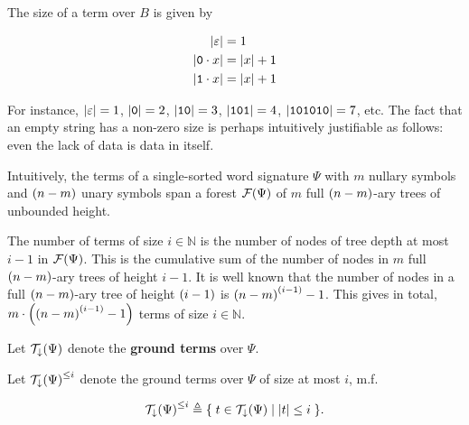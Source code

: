 \begin{example} The size of a term over $B$ is given by

\begin{align*}
\card{\varepsilon} &= 1 \\
\card{\mathtt{0} \cdot x} &= \card{x} + 1 \\
\card{\mathtt{1} \cdot x} &= \card{x} + 1
\end{align*}

For instance, $\card{\varepsilon}=1$, $\card{\symb{0}} = 2$,
$\card{\symb{1}\symb{0}} = 3$, $\card{\symb{1}\symb{0}\symb{1}} = 4$,
$\card{\symb{1}\symb{0}\symb{1}\symb{0}\symb{1}\symb{0}} = 7$, etc. The fact
that an empty string has a non-zero size is perhaps intuitively justifiable as
follows: even the lack of data is data in itself.

Intuitively, the terms of a single-sorted word signature $\Psi$ with $m$
nullary symbols and $\p{n-m}$ unary symbols span a forest $\mathcal{F}\p{\Psi}$
of $m$ full $\p{n-m}$-ary trees of unbounded height.


The number of terms of size $i\in\mathbb{N}$ is the number of nodes of tree
depth at most $i-1$ in $\mathcal{F}\p{\Psi}$. This is the cumulative sum of the
number of nodes in $m$ full $\p{n-m}$-ary trees of height $i-1$. It is well
known that the number of nodes in a full $\p{n-m}$-ary tree of height $\p{i-1}$
is $\p{n-m}^\p{i-1}-1$. This gives in total, $m \cdot \p{\p{n-m}^\p{i-1}-1}$
terms of size $i\in\mathbb{N}$.

\end{example}

\begin{definition} Let $\mathcal{T}_\downarrow\p{\Psi}$ denote the
\textbf{ground terms} over $\Psi$. \end{definition}

\begin{definition} Let $\mathcal{T}_\downarrow\p{\Psi}^{\leq i}$ denote the ground terms
over $\Psi$ of size at most $i$, m.f.

$$\mathcal{T}_\downarrow\p{\Psi}^{\leq i} \triangleq
\set{t\in\mathcal{T}_\downarrow\p{\Psi} \st{\card{t} \leq i}}.$$

\end{definition}

